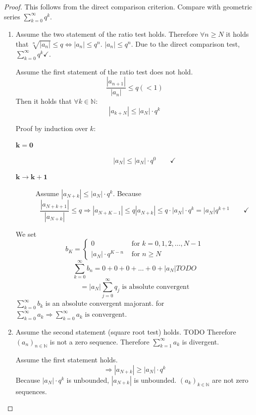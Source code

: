 \documentclass[a4paper,landscape,twocolumn]{article}
\newcommand\abs[1]{\left|#1\right|}
\newcommand\seq[1]{{\left(#1\right)}_{n \in \mathbb N}}
\begin{document}
\begin{proof}
  This follows from the direct comparison criterion. Compare with geometric series
  $\sum_{k=0}^\infty q^k$.
  \begin{enumerate}
    \item
      Assume the two statement of the ratio test holds. Therefore $\forall n \geq N$
      it holds that $\sqrt[n]{\abs{a_n}} \leq q \Leftrightarrow \abs{a_n} \leq q^n$.
      $\abs{a_n} \leq q^n$.
      Due to the direct comparison test, $\sum_{k=0}^\infty q^k \checkmark$.

      Assume the first statement of the ratio test does not hold.
      \[ \frac{\abs{a_{n+1}}}{\abs{a_n}} \leq q (< 1) \]
      Then it holds that $\forall k \in \mathbb N$:
      \[ \abs{a_{k+N}} \leq \abs{a_N} \cdot q^k \]

      Proof by induction over $k$:
      \begin{description}
        \item[$\mathbf{k=0}$] \[ \abs{a_N} \leq \abs{a_N} \cdot q^0 \qquad\checkmark \]
        \item[$\mathbf{k\to k+1}$]
          Assume $\abs{a_{N+k}} \leq \abs{a_N} \cdot q^k$.
          Because
          \[
            \frac{\abs{a_{N+k+1}}}{\abs{a_{N+k}}} \leq q
            \Rightarrow \abs{a_{N+K-1}} \leq q \abs{a_{N+k}}
            \leq q \cdot \abs{a_N} \cdot q^k
            = \abs{a_N} q^{k+1}
            \qquad \checkmark
          \]
      \end{description}
      We set
      \[
        b_K = \begin{cases}
          0 & \text{ for } k = 0,1,2,\dots,N-1 \\
          \abs{a_N} \cdot q^{K-n} & \text{ for } n \geq N
        \end{cases}
      \]
      \[ \sum_{k=0}^\infty b_n = 0 + 0 + 0 + \dots + 0 + \abs{a_N} TODO \]
      \[ = \abs{a_N} \sum_{j=0}^\infty q_j \text{ is absolute convergent} \]
      $\sum_{k=0}^\infty b_k$ is an absolute convergent majorant.
      for $\sum_{k=0}^\infty a_k \Rightarrow \sum_{k=0}^\infty a_k \text{ is convergent}$.
    \item
      Assume the second statement (square root test) holds.
      TODO
      Therefore $\seq{a_n}$ is not a zero sequence.
      Therefore $\sum_{k=1}^\infty a_k$ is divergent.

      Assume the first statement holds.
      \[ \Rightarrow \abs{a_{N+k}} \geq \abs{a_N} \cdot q^k \]
      Because $\abs{a_N} \cdot q^k$ is unbounded, $\abs{a_{N+k}}$ is unbounded.
      $\left(a_k\right)_{k\in\mathbb N}$ are not zero sequences.
  \end{enumerate}
\end{proof}
\end{document}
